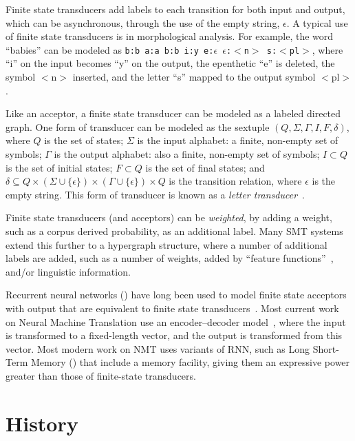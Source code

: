 Finite state transducers add labels to each transition for both input and output, which can be
asynchronous, through the use of the empty string, $\epsilon$. A typical use of finite state
transducers is in morphological analysis. For example, the word ``babies'' can be modeled as
\texttt{b:b a:a b:b i:y e:$\epsilon$ $\epsilon$:$<$n$>$ s:$<$pl$>$}, where ``i'' on the input
becomes ``y'' on the output, the epenthetic ``e'' is deleted, the symbol $<$n$>$ inserted, and
the letter ``s'' mapped to the output symbol $<$pl$>$.

Like an acceptor, a finite state transducer can be modeled as a labeled directed graph. One
form of transducer can be modeled as the sextuple $(Q, \Sigma, \Gamma, I, F, \delta)$, where
$Q$ is the set of states; $\Sigma$ is the input alphabet: a finite, non-empty set of symbols;
$\Gamma$ is the output alphabet: also a finite, non-empty set of symbols; $I \subset Q$ is the
set of initial states; $F \subset Q$ is the set of final states; and 
$\delta \subseteq Q \times (\Sigma\cup\{\epsilon\}) \times (\Gamma\cup\{\epsilon\}) \times Q$
is the transition relation, where $\epsilon$ is the empty string. This form of transducer is
known as a \textit{letter transducer}~\cite[pp. 14--63]{roche1997fst}.

Finite state transducers (and acceptors) can be \textit{weighted}, by adding a weight, such
as a corpus derived probability, as an additional label. Many SMT systems extend this further
to a hypergraph structure, where a number of additional labels are added, such as a number of
weights, added by ``feature functions''~\citep{och2002maxent}, and/or linguistic information.

Recurrent neural networks () have long been used to model finite state acceptors with output that 
are equivalent to finite state transducers~\citep[e.g.,][]{Mikel96beyondmealy}. Most current
work on Neural Machine Translation use an encoder--decoder model~\citep{cho2014rnnencdec},
where the input is transformed to a fixed-length vector, and the output is transformed from
this vector. Most modern work on NMT uses variants of RNN, such as Long Short-Term Memory
() that include a memory facility, giving them an expressive power greater than
those of finite-state transducers.


\section{History}
\label{sect:bghist}

